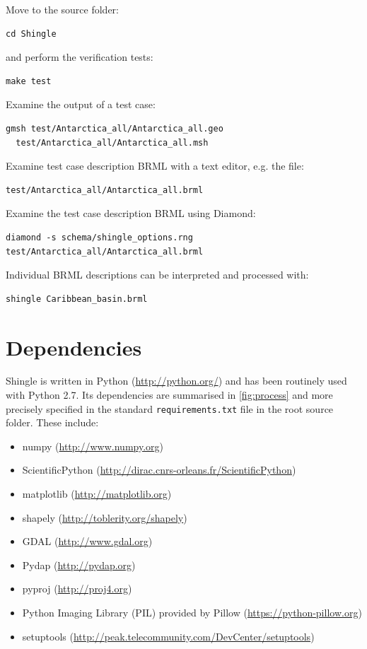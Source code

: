 \documentclass[a4paper, 10pt]{book}
\providecommand{\shingle}{Shingle\xspace}
\providecommand{\brml}{BRML\xspace}
\begin{document}
\noindent
Move to the source folder:
\begin{verbatim}
cd Shingle
\end{verbatim}

\noindent
and perform the verification tests:
\begin{verbatim}
make test
\end{verbatim}

\noindent
Examine the output of a test case:
\begin{verbatim}
gmsh test/Antarctica_all/Antarctica_all.geo 
  test/Antarctica_all/Antarctica_all.msh
\end{verbatim}

\noindent
Examine test case description \brml with a text editor, e.g. the file:
\begin{verbatim}
test/Antarctica_all/Antarctica_all.brml
\end{verbatim}

\noindent
Examine the test case description \brml using Diamond:
\begin{verbatim}
diamond -s schema/shingle_options.rng test/Antarctica_all/Antarctica_all.brml
\end{verbatim}

\noindent
Individual \brml descriptions can be interpreted and processed with:
\begin{verbatim}
shingle Caribbean_basin.brml
\end{verbatim}

\section{Dependencies}

\shingle is written in Python
(\url{http://python.org/})
and has been routinely used with Python 2.7.
Its dependencies are summarised in \cref{fig:process}
and more precisely specified 
in the standard 
\verb+requirements.txt+ file in the root source folder.
These include:

\begin{itemize}
\item numpy
  (\url{http://www.numpy.org})
\item ScientificPython
  (\url{http://dirac.cnrs-orleans.fr/ScientificPython})
\item matplotlib
  (\url{http://matplotlib.org})
\item shapely
  (\url{http://toblerity.org/shapely})
\item GDAL
  (\url{http://www.gdal.org})
\item Pydap
  (\url{http://pydap.org})
\item pyproj
  (\url{http://proj4.org})
\item Python Imaging Library (PIL) provided by Pillow
  (\url{https://python-pillow.org})
\item setuptools
  (\url{http://peak.telecommunity.com/DevCenter/setuptools})
\end{itemize}
\end{document}
